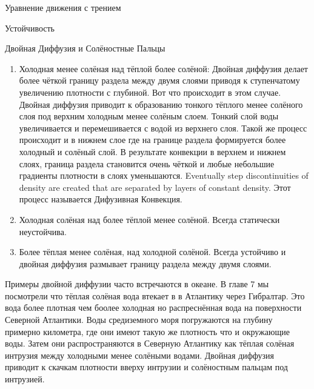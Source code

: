 \begin{chapter}{Уравнение движения с трением}
\begin{section}{Устойчивость}
\begin{paragraph}{Двойная Диффузия и Солёностные Пальцы}
\begin{enumerate}
\item
Холодная менее солёная над тёплой более солёной: Двойная диффузия
делает более чёткой границу раздела между двумя слоями приводя к
ступенчатому увеличению плотности с глубиной. Вот что происходит в
этом случае. Двойная диффузия приводит к образованию тонкого тёплого
менее солёного слоя под верхним холодным менее солёным слоем. Тонкий
слой воды увеличивается и перемешивается с водой из верхнего
слоя. Такой же процесс происходит и в нижнем слое где на границе
раздела формируется более холодный и солёный слой. В результате
конвекции в верхнем и нижнем слоях, граница раздела становится очень
чёткой и любые небольшие градиенты плотности в слоях
уменьшаются. Eventually step discontinuities of density are created
that are separated by layers of constant density. Этот процесс
называется Дифузивная Конвекция.
%

\item
Холодная солёная над более тёплой менее солёной. Всегда статически
неустойчива.
%

\item
Более тёплая менее солёная, над холодной солёной. Всегда устойчиво и
двойная диффузия размывает границу раздела между двумя слоями.
%
\end{enumerate}

Примеры двойной диффузии часто встречаются в океане. В главе 7 мы
посмотрели что тёплая солёная вода втекает в в Атлантику через
Гибралтар. Это вода более плотная чем боолее холодная но распреснённая
вода на поверхности Северной Атлантики. Воды средиземного моря
погружаются на глубину примерно километра, где они имеют такую же
плотность что и окружающие воды. Затем они распространяются в Северную
Атлантику как тёплая солёная интрузия между холодными менее солёными
водами. Двойная диффузия приводит к скачкам плотности вверху интрузии
и солёностным пальцам под интрузией.


\end{paragraph}
\end{section}
\end{chapter}
